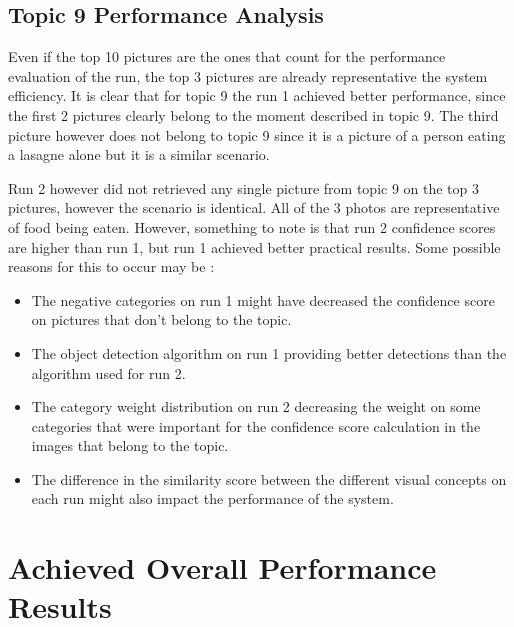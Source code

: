   \subsection{Topic 9 Performance Analysis}

  Even if the top 10 pictures are the ones that count for the performance evaluation of the run, the top 3 pictures are already representative the system efficiency. It is clear that for topic 9 the run 1 achieved better performance, since the first 2 pictures clearly belong to the moment described in topic 9. The third picture however does not belong to topic 9 since it is a picture of a person eating a lasagne alone but it is a similar scenario.
  
  Run 2 however did not retrieved any single picture from topic 9 on the top 3 pictures, however the scenario is identical. All of the 3 photos are representative of food being eaten. However, something to note is that run 2 confidence scores are higher than run 1, but run 1 achieved better practical results. Some possible reasons for this to occur may be :

  \begin{itemize}
    \itemsep0em
    \item The negative categories on run 1 might have decreased the confidence score on  pictures that don't belong to the topic.
    \item The object detection algorithm on run 1 providing better detections than the algorithm used for run 2.
    \item The category weight distribution on run 2 decreasing the weight on some categories that were important for the confidence score calculation in the images that belong to the topic.
    \item The difference in the similarity score between the different visual concepts on each run might also impact the performance of the system.
  \end{itemize}



\section{Achieved Overall Performance Results}
\label{sec:perfomance_results}

